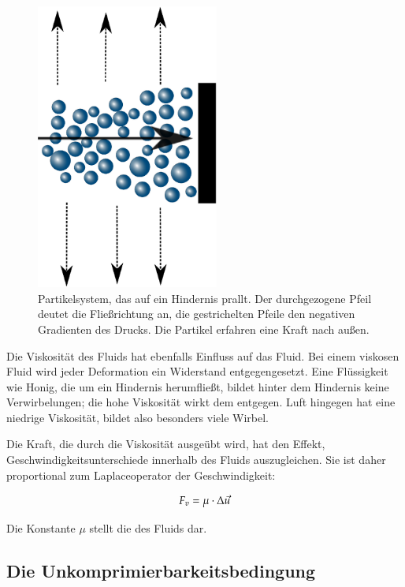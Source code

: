 \begin{figure}[ht]
\centering
\includegraphics[width=6cm]{images/particle_system_wall_collision}
\caption{Partikelsystem, das auf ein Hindernis prallt. Der durchgezogene Pfeil deutet die Fließrichtung an, die gestrichelten Pfeile den negativen Gradienten des Drucks. Die Partikel erfahren eine Kraft nach außen.}
\label{fig:navier_stokes_particle_system_wall_collision}
\end{figure}

Die Viskosität des Fluids hat ebenfalls Einfluss auf das Fluid. Bei einem
viskosen Fluid wird jeder Deformation ein Widerstand entgegengesetzt. Eine
Flüssigkeit wie Honig, die um ein Hindernis herumfließt, bildet hinter dem
Hindernis keine Verwirbelungen; die hohe Viskosität wirkt dem entgegen. Luft
hingegen hat eine niedrige Viskosität, bildet also besonders viele Wirbel.

Die Kraft, die durch die Viskosität ausgeübt wird, hat den Effekt,
Geschwindigkeitsunterschiede innerhalb des Fluids auszugleichen. Sie ist
daher proportional zum Laplaceoperator der Geschwindigkeit:

\begin{equation}
\label{eq:navier_stokes_f_v}
F_v = \mu \cdot \Delta \vec{u}
\end{equation}

Die Konstante $\mu$ stellt die 
des Fluids dar.

\subsection{Die Unkomprimierbarkeitsbedingung}
\label{sec:mathematics_incompressibility_condition_section}


